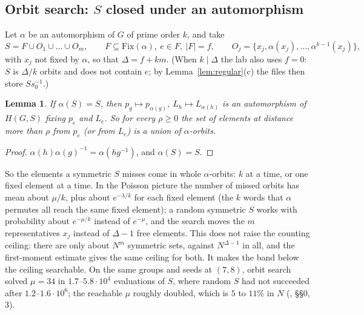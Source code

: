 \documentclass[11pt]{amsart}
\newtheorem{lemma}[theorem]{Lemma}
\theoremstyle{definition}
\theoremstyle{remark}
\begin{document}
\subsection{Orbit search: \texorpdfstring{$S$}{S} closed under an automorphism}\label{ssec:orbit}

Let $\alpha$ be an automorphism of $G$ of prime order $k$, and take
$$S=F\cup O_1\cup\dots\cup O_m,\qquad F\subseteq\mathrm{Fix}(\alpha),\ e\in F,\ |F|=f,\qquad O_j=\{x_j,\alpha(x_j),\dots,\alpha^{k-1}(x_j)\},$$
with $x_j$ not fixed by $\alpha$, so that $\Delta=f+km$. (When $k\mid\Delta$ the lab also uses $f=0$: $S$ is $\Delta/k$ orbits and does not contain $e$; by Lemma~\ref{lem:regular}(c) the files then store $Ss_0^{-1}$.)

\begin{lemma}\label{lem:orbit}
If $\alpha(S)=S$, then $p_g\mapsto p_{\alpha(g)}$, $L_h\mapsto L_{\alpha(h)}$ is an automorphism of $H(G,S)$ fixing $p_e$ and $L_e$. So for every $\rho\ge0$ the set of elements at distance more than $\rho$ from $p_e$ (or from $L_e$) is a union of $\alpha$-orbits.
\end{lemma}

\begin{proof}
$\alpha(h)\alpha(g)^{-1}=\alpha(hg^{-1})$, and $\alpha(S)=S$.
\end{proof}

So the elements a symmetric $S$ misses come in whole $\alpha$-orbits: $k$ at a time, or one fixed element at a time. In the Poisson picture the number of missed orbits has mean about $\mu/k$, plus about $e^{-\lambda/k}$ for each fixed element (the $k$ words that $\alpha$ permutes all reach the same fixed element); a random symmetric $S$ works with probability about $e^{-\mu/k}$ instead of $e^{-\mu}$, and the search moves the $m$ representatives $x_j$ instead of $\Delta-1$ free elements. This does not raise the counting ceiling: there are only about $N^m$ symmetric sets, against $N^{\Delta-1}$ in all, and the first-moment estimate gives the same ceiling for both. It makes the band below the ceiling searchable. On the same groups and seeds at $(7,8)$, orbit search solved $\mu=34$ in $1.7$--$5.8\cdot10^4$ evaluations of $S$, where random $S$ had not succeeded after $1.2$--$1.6\cdot10^6$; the reachable $\mu$ roughly doubled, which is $5$ to $11\%$ in $N$ (, \S\S0, 3).
\end{document}
